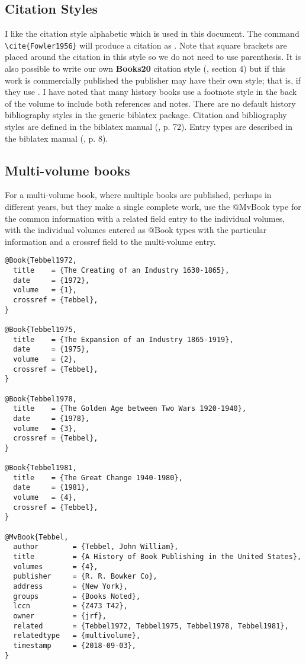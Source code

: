 \documentclass{article}
\begin{document}
\subsection{Citation Styles}

I like the citation style {\ttfamily alphabetic} which is used in this
document. The command \verb|\cite{Fowler1956}| will produce a citation
as \cite{Fowler1956}. Note that square brackets are placed around the
citation in this style so we do not need to use parenthesis. It is
also possible to write our own {\bfseries Books20} citation style
(\cite{Kime2019}, section 4) but if this work is commercially
published the publisher may have their own style; that is, if they use
\LaTeXe.  I have noted that many history books use a footnote style in
the back of the volume to include both references and notes. There are
no default history bibliography styles in the generic {\ttfamily
  biblatex} package. Citation and bibliography styles are defined in
the {\ttfamily biblatex} manual (\cite{Kime2019}, p. 72).  Entry types
are described in the {\ttfamily biblatex} manual (\cite{Kime2019},
p. 8).

\subsection{Multi-volume books}

For a multi-volume book, where multiple books are published, perhaps
in different years, but they make a single complete work, use the
{\ttfamily @MvBook} type for the common information with a {\ttfamily
  related} field entry to the individual volumes, with the individual
volumes entered as {\ttfamily @Book} types with the particular
information and a {\ttfamily crossref} field to the multi-volume
entry.

\begin{verbatim}
@Book{Tebbel1972,
  title    = {The Creating of an Industry 1630-1865},
  date     = {1972},
  volume   = {1},
  crossref = {Tebbel},
}

@Book{Tebbel1975,
  title    = {The Expansion of an Industry 1865-1919},
  date     = {1975},
  volume   = {2},
  crossref = {Tebbel},
}

@Book{Tebbel1978,
  title    = {The Golden Age between Two Wars 1920-1940},
  date     = {1978},
  volume   = {3},
  crossref = {Tebbel},
}

@Book{Tebbel1981,
  title    = {The Great Change 1940-1980},
  date     = {1981},
  volume   = {4},
  crossref = {Tebbel},
}

@MvBook{Tebbel,
  author        = {Tebbel, John William},
  title         = {A History of Book Publishing in the United States},
  volumes       = {4},
  publisher     = {R. R. Bowker Co},
  address       = {New York},
  groups        = {Books Noted},
  lccn          = {Z473 T42},
  owner         = {jrf},
  related       = {Tebbel1972, Tebbel1975, Tebbel1978, Tebbel1981},
  relatedtype   = {multivolume},
  timestamp     = {2018-09-03},
}
\end{verbatim}
\end{document}
